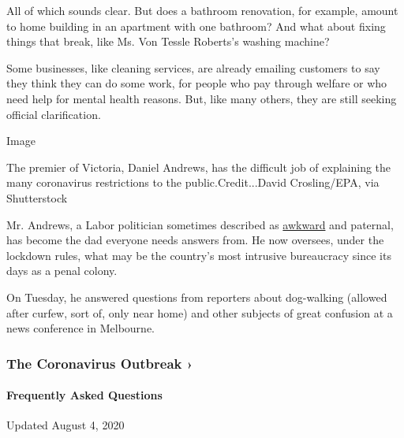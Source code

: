 All of which sounds clear. But does a bathroom renovation, for example,
amount to home building in an apartment with one bathroom? And what
about fixing things that break, like Ms. Von Tessle Roberts's washing
machine?

Some businesses, like cleaning services, are already emailing customers
to say they think they can do some work, for people who pay through
welfare or who need help for mental health reasons. But, like many
others, they are still seeking official clarification.

Image

The premier of Victoria, Daniel Andrews, has the difficult job of
explaining the many coronavirus restrictions to the
public.Credit...David Crosling/EPA, via Shutterstock

Mr. Andrews, a Labor politician sometimes described as
\href{https://www.theage.com.au/national/victoria/the-strange-feeling-i-have-when-i-watch-daniel-andrews-20200710-p55av5.html}{awkward}
and paternal, has become the dad everyone needs answers from. He now
oversees, under the lockdown rules, what may be the country's most
intrusive bureaucracy since its days as a penal colony.

On Tuesday, he answered questions from reporters about dog-walking
(allowed after curfew, sort of, only near home) and other subjects of
great confusion at a news conference in Melbourne.

\href{https://www.nytimes.com/news-event/coronavirus?action=click\&pgtype=Article\&state=default\&region=MAIN_CONTENT_3\&context=storylines_faq}{}

\hypertarget{the-coronavirus-outbreak-}{%
\subsubsection{The Coronavirus Outbreak
›}\label{the-coronavirus-outbreak-}}

\hypertarget{frequently-asked-questions}{%
\paragraph{Frequently Asked
Questions}\label{frequently-asked-questions}}

Updated August 4, 2020

